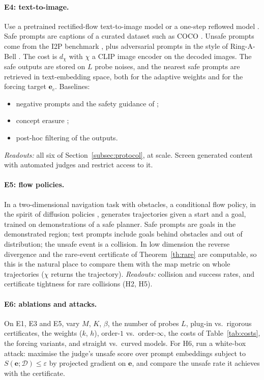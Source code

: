 \documentclass{article}
\newcommand{\cD}{\mathcal{D}}                       %
\newcommand{\be}{\mathbf{e}}                       %
\theoremstyle{plain}
\begin{document}
\paragraph{E4: text-to-image.} Use a pretrained rectified-flow text-to-image model \citep{esser2024scaling} or
a one-step reflowed model \citep{liu2024instaflow}. Safe prompts are captions of a curated dataset such as
COCO \citep{lin2014microsoft}. Unsafe prompts come from the I2P benchmark \citep{schramowski2023safe}, plus
adversarial prompts in the style of Ring-A-Bell \citep{tsai2024ringabell}. The cost is $d_\chi$ with $\chi$ a CLIP
image encoder on the decoded images. The safe outputs are stored on $L$ probe noises, and the nearest safe
prompts are retrieved in text-embedding space, both for the adaptive weights and for the forcing target
$\be_c$. Baselines:
\begin{itemize}
\item negative prompts and the safety guidance of \citet{schramowski2023safe};
\item concept erasure \citep{gandikota2023erasing};
\item post-hoc filtering of the outputs.
\end{itemize}
\emph{Readouts:} all six of Section~\ref{subsec:protocol}, at scale. Screen generated content with automated
judges and restrict access to it.

\paragraph{E5: flow policies.} In a two-dimensional navigation task with obstacles, a conditional flow policy,
in the spirit of diffusion policies \citep{chi2023diffusion}, generates trajectories given a start and a goal,
trained on demonstrations of a safe planner. Safe prompts are goals in the demonstrated region; test prompts
include goals behind obstacles and out of distribution; the unsafe event is a collision. In low dimension
the reverse divergence and the rare-event certificate of Theorem~\ref{th:rare} are computable, so this is the
natural place to compare them with the map metric on whole trajectories ($\chi$ returns the trajectory).
\emph{Readouts:} collision and success rates, and certificate tightness for rare collisions (H2, H5).

\paragraph{E6: ablations and attacks.} On E1, E3 and E5, vary $M$, $K$, $\beta$, the number of probes $L$,
plug-in vs.\ rigorous certificates, the weights ($k$, $h$), order-$1$ vs.\ order-$\infty$, the costs of
Table~\ref{tab:costs}, the forcing variants, and straight vs.\ curved models. For H6, run a white-box attack:
maximise the judge's unsafe score over prompt embeddings subject to $S(\be;\cD)\leq\varepsilon$ by projected
gradient on $\be$, and compare the unsafe rate it achieves with the certificate.
\end{document}
